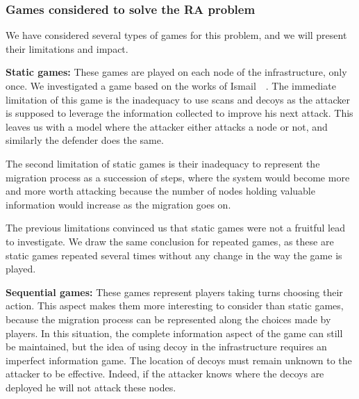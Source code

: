 \subsubsection{Games considered to solve the RA problem}
We have considered several types of games for this problem, and we will present their limitations and impact.

\textbf{Static games:} These games are played on each node of the infrastructure, only once. We investigated a game based on the works of Ismail~\etal~\cite{Chen2009,interdep-ismail2017}. The immediate limitation of this game is the inadequacy to use scans and decoys as the attacker is supposed to leverage the information collected to improve his next attack. This leaves us with a model where the attacker either attacks a node or not, and similarly the defender does the same.

The second limitation of static games is their inadequacy to represent the migration process as a succession of steps, where the system would become more and more worth attacking because the number of nodes holding valuable information would increase as the migration goes on.


The previous limitations convinced us that static games were not a fruitful lead to investigate.
We draw the same conclusion for repeated games, as these are static games repeated several times without any change in the way the game is played.


\textbf{Sequential games: } These games represent players taking turns choosing their action. This aspect makes them more interesting to consider than static games, because the migration process can be represented along the choices made by players. In this situation, the complete information aspect of the game can still be maintained, but the idea of using decoy in the infrastructure requires an imperfect information game. The location of decoys must remain unknown to the attacker to be effective.
Indeed, if the attacker knows where the decoys are deployed he will not attack these nodes.

